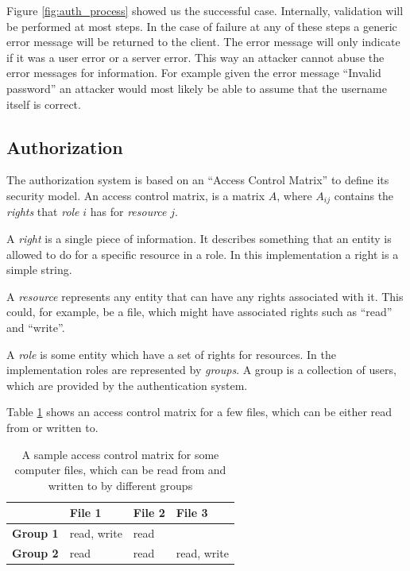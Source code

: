 Figure \ref{fig:auth_process} showed us the successful case. Internally,
validation will be performed at most steps. In the case of failure at
any of these steps a generic error message will be returned to the
client. The error message will only indicate if it was a user error or a
server error. This way an attacker cannot abuse the error messages for
information. For example given the error message ``Invalid password'' an
attacker would most likely be able to assume that the username itself is
correct.

\subsection{Authorization}
\label{sec:authorization}

The authorization system is based on an ``Access Control
Matrix''\cite{sandhu1994access} to define its security model. An access control
matrix, is a matrix $A$, where $A_{ij}$ contains the \emph{rights} that
\emph{role} $i$ has for \emph{resource} $j$.

A \emph{right} is a single piece of information. It describes something that an
entity is allowed to do for a specific resource in a role. In this
implementation a right is a simple string.

A \emph{resource} represents any entity that can have any rights associated
with it. This could, for example, be a file, which might have associated rights
such as ``read'' and ``write''.

A \emph{role} is some entity which have a set of rights for resources. In the
implementation roles are represented by \emph{groups}. A group is a
collection of users, which are provided by the authentication system.

Table \ref{tab:acm_example} shows an access control matrix for a few files,
which can be either read from or written to.

\begin{table}[H]
  \begin{center}
  \begin{tabular}{ | l | l | l | l | }
    \hline
            & \textbf{File 1}        & \textbf{File 2}      & \textbf{File 3}
    \\ \hline
    \textbf{Group 1} & read, write   & read                 &
    \\ \hline
    \textbf{Group 2} & read          & read                 & read, write
    \\ \hline
  \end{tabular}
  \end{center}

  \caption{A sample access control matrix for some computer files, which can be
      read from and written to by different groups}

  \label{tab:acm_example}
\end{table}

